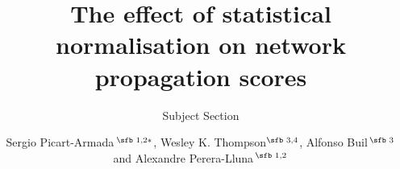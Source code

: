 \documentclass[final]{bioinfo}
\begin{document}

\subtitle{Subject Section}

\title[Statistical normalisation on propagation scores]{The effect of statistical normalisation on network propagation scores}
\author[S. Picart-Armada \textit{et~al}.]{Sergio Picart-Armada\,$^{\text{\sfb 1,2}*}$, Wesley K. Thompson$^{\text{\sfb 3,4}}$, Alfonso Buil\,$^{\text{\sfb 3}}$ and Alexandre Perera-Lluna\,$^{\text{\sfb 1,2}}$}
\address{$^{\text{\sf 1}}$B2SLab, Departament d'Enginyeria de Sistemes, Autom\`atica i Inform\`atica Industrial, Universitat Polit\`ecnica de Catalunya, CIBER-BBN, Barcelona, 08028, Spain, $^{\text{\sf 2}}$Institut de Recerca Pedi\`atrica Hospital Sant Joan de D\'eu, Esplugues de Llobregat, Barcelona, 08950, Spain, $^{\text{\sf 3}}$Mental Health Center Sct. Hans, 4000 Roskilde, Denmark and $^{\text{\sf 4}}$Department of Family Medicine and Public Health, University of California, San Diego, La Jolla, California, USA.}



\end{document}
